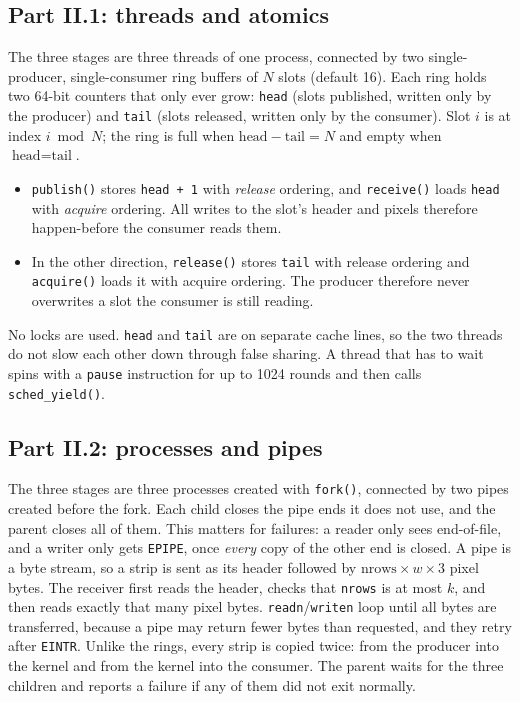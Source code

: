 \documentclass[11pt,a4paper]{article}
\newcommand{\cfgRing}{16}
\newcommand{\code}[1]{\texttt{#1}}
\begin{document}
\subsection{Part II.1: threads and atomics}
The three stages are three threads of one process, connected by two single-producer,
single-consumer ring buffers of $N$ slots (default \cfgRing). Each ring holds two 64-bit counters
that only ever grow: \code{head} (slots published, written only by the producer) and \code{tail}
(slots released, written only by the consumer). Slot $i$ is at index $i \bmod N$; the ring is
full when $\text{head}-\text{tail} = N$ and empty when $\text{head} = \text{tail}$.
\begin{itemize}
\item \code{publish()} stores \code{head + 1} with \emph{release} ordering, and \code{receive()}
  loads \code{head} with \emph{acquire} ordering. All writes to the slot's header and pixels
  therefore happen-before the consumer reads them.
\item In the other direction, \code{release()} stores \code{tail} with release ordering and
  \code{acquire()} loads it with acquire ordering. The producer therefore never overwrites a slot
  the consumer is still reading.
\end{itemize}
No locks are used. \code{head} and \code{tail} are on separate cache lines, so the two threads
do not slow each other down through false sharing. A thread that has to wait spins with a
\code{pause} instruction for up to 1024 rounds and then calls \code{sched\_yield()}.

\subsection{Part II.2: processes and pipes}
The three stages are three processes created with \code{fork()}, connected by two pipes created
before the fork. Each child closes the pipe ends it does not use, and the parent closes all of
them. This matters for failures: a reader only sees end-of-file, and a writer only gets
\code{EPIPE}, once \emph{every} copy of the other end is closed. A pipe is a byte stream, so a
strip is sent as its header followed by $\text{nrows}\times w\times3$ pixel bytes. The receiver
first reads the header, checks that \code{nrows} is at most $k$, and then reads exactly that many
pixel bytes. \code{readn}/\code{writen} loop until all bytes are transferred, because a pipe may
return fewer bytes than requested, and they retry after \code{EINTR}. Unlike the rings, every
strip is copied twice: from the producer into the kernel and from the kernel into the consumer.
The parent waits for the three children and reports a failure if any of them did not exit
normally.
\end{document}

